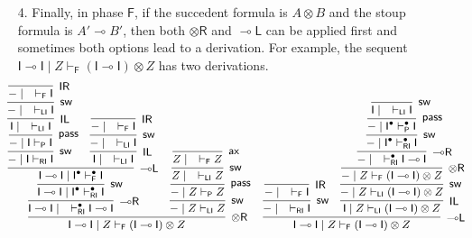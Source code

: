 \documentclass[copyright,creativecommons]{eptcs}
\theoremstyle{definition}
\newcommand{\tr}{\otimes \mathsf{R}}
\newcommand{\lright}{{\multimap}\mathsf{R}}
\newcommand{\lleft}{{\multimap}\mathsf{L}}
\newcommand{\pass}{\mathsf{pass}}
\newcommand{\unitl}{\mathsf{IL}}
\newcommand{\unitr}{\mathsf{IR}}
\newcommand{\ax}{\mathsf{ax}}
\newcommand{\ot}{\otimes}
\newcommand{\lolli}{\multimap}
\newcommand{\I}{\mathsf{I}}
\newcommand{\RI}{\mathsf{RI}}
\newcommand{\LI}{\mathsf{LI}}
\newcommand{\Pass}{\mathsf{P}}
\newcommand{\F}{\mathsf{F}}
\begin{document}
\begin{enumerate}
\begin{equation*}
\begin{array}{cc}
{{          }
        }
  \end{array}
  \normalsize
\end{equation*}
\item[4.] Finally, in phase $\F$, if the succedent formula is $A \ot B$ and the stoup formula is $A' \lolli B'$, then both $\tr$ and $\lleft$ can be applied first and sometimes both options lead to a derivation. For example, the sequent 
$\I \lolli \I \mid Z \vdash_{\F} (\I \lolli \I) \ot Z$ has two derivations. 
\begin{equation*}
\hspace*{-5mm}
\small
  \begin{array}{cc}
    \infer[\tr]{\I \lolli \I \mid Z \vdash_{\F} (\I \lolli \I) \ot Z}{
      \infer[\lright]{\I \lolli \I \mid \quad \vdash^{\bullet}_{\RI} \I \lolli \I}{
        \infer[\mathsf{sw}]{\I \lolli \I \mid \I^{\bullet} \vdash^{\bullet}_{\RI} \I}{
          \infer[\lleft]{\I \lolli \I \mid \I^{\bullet} \vdash^{\bullet}_{\F} \I}{
            \infer[\mathsf{sw}]{{-} \mid \I \vdash_{\RI} \I}{
              \infer[\pass]{{-} \mid \I \vdash_{\Pass} \I}{
                \infer[\unitl]{\I \mid \quad \vdash_{\LI} \I}{
                  \infer[\mathsf{sw}]{{-} \mid \quad \vdash_{\LI} \I}{
                    \infer[\unitr]{{-} \mid \quad \vdash_{\F} \I}{}
                  }
                }
              }
            }
            &
            \infer[\unitl]{\I \mid \quad \vdash_{\LI} \I}{
              \infer[\mathsf{sw}]{{-} \mid \quad \vdash_{\LI} \I}{
                \infer[\unitr]{{-} \mid \quad \vdash_{\F} \I}{}
              }
            }
          }
        }
      }
      &
      \infer[\mathsf{sw}]{{-} \mid Z \vdash_{\LI} Z}{
        \infer[\pass]{{-} \mid Z \vdash_{\Pass} Z}{
          \infer[\mathsf{sw}]{Z \mid \quad \vdash_{\LI} Z}{
            \infer[\ax]{Z \mid \quad \vdash_{\F} Z}{}
          }
        }
      }
    }
    &
    \infer[\lleft]{\I \lolli \I \mid Z \vdash_{\F} (\I \lolli \I) \ot Z}{
      \infer[\mathsf{sw}]{{-} \mid \quad \vdash_{\RI} \I}{
        \infer[\unitr]{{-} \mid \quad \vdash_{\F} \I}{}
      }
      &
      \infer[\unitl]{\I \mid Z \vdash_{\LI} (\I \lolli \I) \ot Z}{
        \infer[\mathsf{sw}]{{-} \mid Z \vdash_{\LI} (\I \lolli \I) \ot Z}{
          \infer[\tr]{{-} \mid Z \vdash_{\F} (\I \lolli \I) \ot Z}{
            \infer[\lright]{{-} \mid \quad \vdash^{\bullet}_{\RI} \I \lolli \I}{
              \infer[\mathsf{sw}]{{-} \mid \I^{\bullet} \vdash^{\bullet}_{\RI} \I}{
                \infer[\pass]{{-} \mid \I^{\bullet} \vdash^{\bullet}_{\Pass} \I}{
                  \infer[\mathsf{sw}]{\I \mid \quad \vdash_{\LI} \I}{
}}}}}}}}
\end{array}
\end{equation*}
\end{enumerate}
\end{document}
